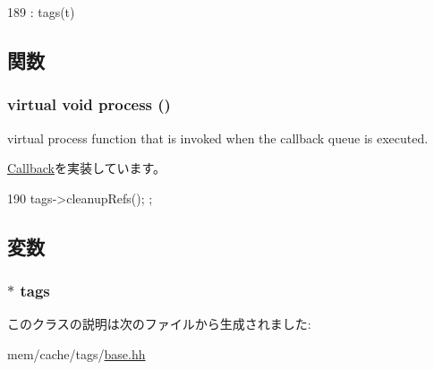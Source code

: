 \begin{DoxyCode}
189 : tags(t) {}
\end{DoxyCode}


\subsection{関数}
\hypertarget{classBaseTagsCallback_a6780fc1879338e1ff38faf7279ec6a0b}{
\subsubsection[{process}]{\setlength{\rightskip}{0pt plus 5cm}virtual void process ()}}
\label{classBaseTagsCallback_a6780fc1879338e1ff38faf7279ec6a0b}
virtual process function that is invoked when the callback queue is executed. 

\hyperlink{classCallback_a142b75b68a6291400e20fb0dd905b1c8}{Callback}を実装しています。


\begin{DoxyCode}
190 { tags->cleanupRefs(); };
\end{DoxyCode}


\subsection{変数}
\hypertarget{classBaseTagsCallback_a6819886aaca345d2e681ba3ef01f96c4}{
\subsubsection[{tags}]{$\ast$ {\bf tags}}}
\label{classBaseTagsCallback_a6819886aaca345d2e681ba3ef01f96c4}


このクラスの説明は次のファイルから生成されました:\begin{DoxyCompactItemize}
\item 
mem/cache/tags/\hyperlink{mem_2cache_2tags_2base_8hh}{base.hh}\end{DoxyCompactItemize}
